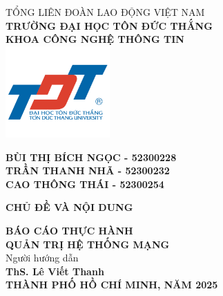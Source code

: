\clearpage %
\begin{titlepage}
    \centering
    \vspace*{0cm}
    {\Large TỔNG LIÊN ĐOÀN LAO ĐỘNG VIỆT NAM} \\
    \vspace{0.2cm}
    {\Large \textbf{TRƯỜNG ĐẠI HỌC TÔN ĐỨC THẮNG}} \\
    \vspace{0.2cm}
    {\Large \textbf{KHOA CÔNG NGHỆ THÔNG TIN}} \\
    \vspace{0.25cm}
    \includegraphics[width=0.3\textwidth]{./media/logo.png} %
    \vspace{0.25cm}
    
    {\large \textbf{BÙI THỊ BÍCH NGỌC - 52300228}} \\
    {\large \textbf{TRẦN THANH NHÃ - 52300232}} \\
    {\large \textbf{CAO THÔNG THÁI - 52300254}} \\
    \vspace{1.75cm}

    {\fontsize{24pt}{30pt}\selectfont \bfseries %
    CHỦ ĐỀ VÀ NỘI DUNG} \\
    \vspace{1.5cm} %
    
    {\fontsize{21pt}{25pt}\selectfont \textbf{BÁO CÁO THỰC HÀNH}} \\
    \vspace{0.5cm}
    {\fontsize{21pt}{24pt}\selectfont \textbf{QUẢN TRỊ HỆ THỐNG MẠNG}} \\
    \vspace{1.5cm}
    Người hướng dẫn\\
    {\large \textbf{ThS. Lê Viết Thanh}} \\
     \vfill %
    {\large \textbf{THÀNH PHỐ HỒ CHÍ MINH, NĂM 2025}}
\end{titlepage}